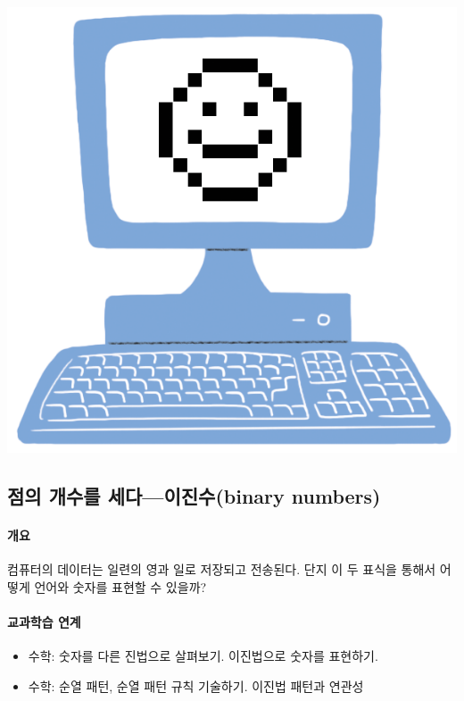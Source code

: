\documentclass[]{article}
\begin{document}
\includegraphics{csunplugged/01-part/img/01-part-one.png}

\subsection{점의 개수를 세다---이진수(binary
numbers)}\label{mdashbinary-numbers}

\mbox{}\paragraph{개요}\label{section-5}

컴퓨터의 데이터는 일련의 영과 일로 저장되고 전송된다. 단지 이 두 표식을
통해서 어떻게 언어와 숫자를 표현할 수 있을까?

\mbox{}\paragraph{교과학습 연계}\label{section-6}

\begin{itemize}
\itemsep1pt\parskip0pt
\item
  수학: 숫자를 다른 진법으로 살펴보기. 이진법으로 숫자를 표현하기.
\item
  수학: 순열 패턴, 순열 패턴 규칙 기술하기. 이진법 패턴과 연관성
\end{itemize}
\end{document}
